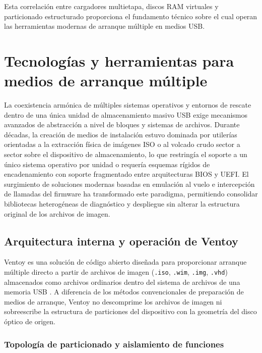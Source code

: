 \documentclass[12pt]{article}
\begin{document}
Esta correlación entre cargadores multietapa, discos RAM virtuales y particionado estructurado proporciona el fundamento técnico sobre el cual operan las herramientas modernas de arranque múltiple en medios USB.

\section{Tecnologías y herramientas para medios de arranque múltiple}
\label{sec:tecnologiasMultiboot}

La coexistencia armónica de múltiples sistemas operativos y entornos de rescate dentro de una única unidad de almacenamiento masivo USB exige mecanismos avanzados de abstracción a nivel de bloques y sistemas de archivos. Durante décadas, la creación de medios de instalación estuvo dominada por utilerías orientadas a la extracción física de imágenes ISO o al volcado crudo sector a sector sobre el dispositivo de almacenamiento, lo que restringía el soporte a un único sistema operativo por unidad o requería esquemas rígidos de encadenamiento con soporte fragmentado entre arquitecturas BIOS y UEFI. El surgimiento de soluciones modernas basadas en emulación al vuelo e intercepción de llamadas del firmware ha transformado este paradigma, permitiendo consolidar bibliotecas heterogéneas de diagnóstico y despliegue sin alterar la estructura original de los archivos de imagen.

\subsection{Arquitectura interna y operación de Ventoy}
\label{sec:arquitecturaVentoy}

Ventoy es una solución de código abierto diseñada para proporcionar arranque múltiple directo a partir de archivos de imagen (\texttt{.iso}, \texttt{.wim}, \texttt{.img}, \texttt{.vhd}) almacenados como archivos ordinarios dentro del sistema de archivos de una memoria USB \parencite{ventoy2024documentation}. A diferencia de los métodos convencionales de preparación de medios de arranque, Ventoy no descomprime los archivos de imagen ni sobreescribe la estructura de particiones del dispositivo con la geometría del disco óptico de origen.

\subsubsection{Topología de particionado y aislamiento de funciones}
\end{document}
